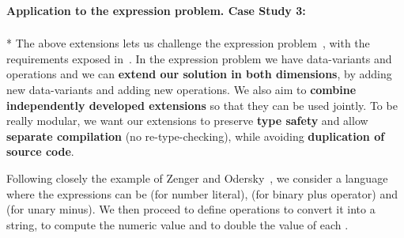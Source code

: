 \paragraph{Application to the expression problem. Case Study 3:}${}_{}$\\*
The above extensions lets us challenge the expression problem~\cite{wadler1998expression},
with the requirements exposed in~\cite{Zenger-Odersky2005}.
In the expression problem we have data-variants and operations and we can
\textbf{extend our solution in both dimensions},
by adding new data-variants and adding new operations.
We also aim to \textbf{combine independently developed extensions} so
that they can be used jointly.
To be really modular, we want our extensions to
preserve \textbf{type safety}
and allow \textbf{separate compilation} (no re-type-checking),
while avoiding \textbf{duplication of source code}.

Following closely
the example of Zenger and Odersky~\cite{Zenger-Odersky2005},
we consider a language where the
expressions \Q@Exp@ can
be \Q@Num@ (for number literal),
\Q@Plus@ (for binary plus operator)
and \Q@Neg@ (for unary minus).
We then proceed to define operations
\Q@show@ to convert it into a string,
 \Q@eval@ to compute the numeric value and 
\Q@double@ to double the value of each \Q@Num@.


